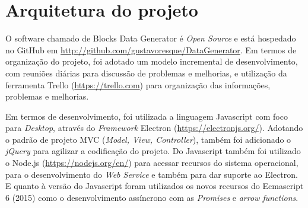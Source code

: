 \documentclass[
	12pt,				%
	openright,			%
	twoside,			%
	a4paper,			%
	english,			%
	brazil				%
	]{abntex2}
\begin{document}

		
\chapter{Arquitetura do projeto}\label{cap_trabalho_academico}

	O software chamado de Blocks Data Generator é \emph{Open Source} e está hospedado no GitHub em \url{http://github.com/gustavoresque/DataGenerator}.
	Em termos de organização do projeto, foi adotado um modelo incremental de desenvolvimento, com reuniões diárias para discussão de problemas e melhorias, e utilização da ferramenta Trello (\url{https://trello.com}) para organização das informações, problemas e melhorias.
	\par
	Em termos de desenvolvimento, foi utilizada a linguagem Javascript com foco para \emph{Desktop}, através do \emph{Framework} Electron (\url{https://electronjs.org/}).
	Adotando o padrão de projeto MVC (\emph{Model, View, Controller}), também foi adicionado o \emph{jQuery} para agilizar a codificação do projeto.
	Do Javascript também foi utilizado o Node.js (\url{https://nodejs.org/en/}) para acessar recursos do sistema operacional, para o desenvolvimento do \emph{Web Service} e também para dar suporte ao Electron.
	E quanto à versão do Javascript foram utilizados os novos recursos do Ecmascript 6 (2015) como o desenvolvimento assíncrono com as \emph{Promises} e \emph{arrow functions}.
	
\end{document}

